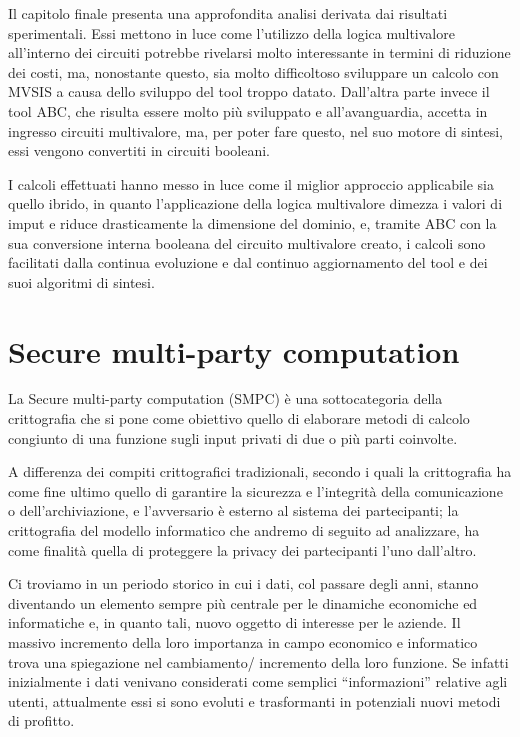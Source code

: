 \documentclass[
]{book}
\begin{document}
\newpage

Il capitolo finale presenta una approfondita analisi derivata dai risultati sperimentali. Essi mettono in luce come l'utilizzo della logica multivalore all'interno dei circuiti potrebbe rivelarsi molto interessante in termini di riduzione dei costi, ma, nonostante questo, sia molto difficoltoso sviluppare un calcolo con MVSIS a causa dello sviluppo del tool troppo datato. Dall'altra parte invece il tool ABC, che risulta essere molto più sviluppato e all'avanguardia, accetta in ingresso circuiti multivalore, ma, per poter fare questo, nel suo motore di sintesi, essi vengono convertiti in circuiti booleani.

I calcoli effettuati hanno messo in luce come il miglior approccio applicabile sia quello ibrido, in quanto l'applicazione della logica multivalore dimezza i valori di imput e riduce drasticamente la dimensione del dominio, e, tramite ABC con la sua conversione interna booleana del circuito multivalore creato, i calcoli sono facilitati dalla continua evoluzione e dal continuo aggiornamento del tool e dei suoi algoritmi di sintesi.

\hypertarget{secure-multi-party-computation}{%
\chapter{Secure multi-party computation}\label{secure-multi-party-computation}}

La Secure multi-party computation (SMPC) è una sottocategoria della crittografia che si pone come obiettivo quello di elaborare metodi di calcolo congiunto di una funzione sugli input privati di due o più parti coinvolte.

A differenza dei compiti crittografici tradizionali, secondo i quali la crittografia ha come fine ultimo quello di garantire la sicurezza e l'integrità della comunicazione o dell'archiviazione, e l'avversario è esterno al sistema dei partecipanti; la crittografia del modello informatico che andremo di seguito ad analizzare, ha come finalità quella di proteggere la privacy dei partecipanti l'uno dall'altro.

Ci troviamo in un periodo storico in cui i dati, col passare degli anni, stanno diventando un elemento sempre più centrale per le dinamiche economiche ed informatiche e, in quanto tali, nuovo oggetto di interesse per le aziende. Il massivo incremento della loro importanza in campo economico e informatico trova una spiegazione nel cambiamento/ incremento della loro funzione. Se infatti inizialmente i dati venivano considerati come semplici ``informazioni'' relative agli utenti, attualmente essi si sono evoluti e trasformanti in potenziali nuovi metodi di profitto.
\end{document}
